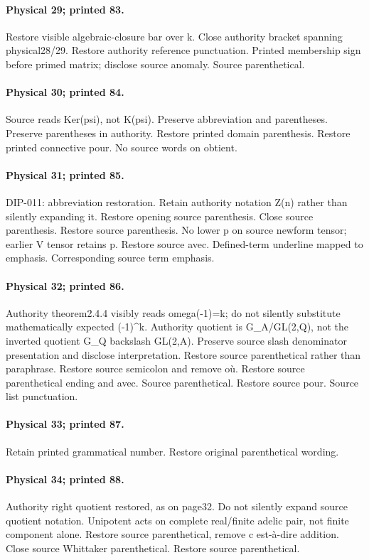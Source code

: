 \documentclass[10pt,a4paper]{article}
\begin{document}
\paragraph{Physical 29; printed 83.} Restore visible algebraic-closure bar over k. Close authority bracket spanning physical28/29. Restore authority reference punctuation. Printed membership sign before primed matrix; disclose source anomaly. Source parenthetical.
\paragraph{Physical 30; printed 84.} Source reads Ker(psi), not K(psi). Preserve abbreviation and parentheses. Preserve parentheses in authority. Restore printed domain parenthesis. Restore printed connective pour. No source words on obtient.
\paragraph{Physical 31; printed 85.} DIP-011: abbreviation restoration. Retain authority notation Z(n) rather than silently expanding it. Restore opening source parenthesis. Close source parenthesis. Restore source parenthesis. No lower p on source newform tensor; earlier V tensor retains p. Restore source avec. Defined-term underline mapped to emphasis. Corresponding source term emphasis.
\paragraph{Physical 32; printed 86.} Authority theorem2.4.4 visibly reads omega(-1)=k; do not silently substitute mathematically expected (-1)\textasciicircum{}k. Authority quotient is G\_A/GL(2,Q), not the inverted quotient G\_Q backslash GL(2,A). Preserve source slash denominator presentation and disclose interpretation. Restore source parenthetical rather than paraphrase. Restore source semicolon and remove où. Restore source parenthetical ending and avec. Source parenthetical. Restore source pour. Source list punctuation.
\paragraph{Physical 33; printed 87.} Retain printed grammatical number. Restore original parenthetical wording.
\paragraph{Physical 34; printed 88.} Authority right quotient restored, as on page32. Do not silently expand source quotient notation. Unipotent acts on complete real/finite adelic pair, not finite component alone. Restore source parenthetical, remove c est-à-dire addition. Close source Whittaker parenthetical. Restore source parenthetical.
\end{document}
